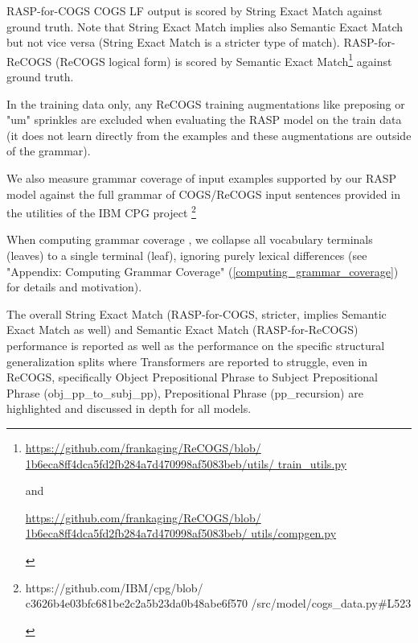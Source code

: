 \documentclass[11pt]{article}
\begin{document}
RASP-for-COGS COGS LF output is scored by String Exact Match against ground truth. Note that String Exact Match implies also Semantic Exact Match but not vice versa (String Exact Match is a stricter type of match).
RASP-for-ReCOGS (ReCOGS logical form) is scored by Semantic Exact Match\footnote{ 
\begin{footnotesize}\href{https://github.com/frankaging/ReCOGS/blob/1b6eca8ff4dca5fd2fb284a7d470998af5083beb/utils/train_utils.py}{https://github.com/frankaging/ReCOGS/blob/
1b6eca8ff4dca5fd2fb284a7d470998af5083beb/utils/
train\_utils.py}

and

\href{https://github.com/frankaging/ReCOGS/blob/1b6eca8ff4dca5fd2fb284a7d470998af5083beb/utils/compgen.py}{https://github.com/frankaging/ReCOGS/blob/
1b6eca8ff4dca5fd2fb284a7d470998af5083beb/
utils/compgen.py}
\end{footnotesize}
} against ground truth.

In the training data only, any ReCOGS training augmentations like preposing or "um" sprinkles are excluded when evaluating the RASP model on the train data (it does not learn directly from the examples and these augmentations are outside of the grammar). 

We also measure grammar coverage of input examples supported by our RASP model against the full grammar of COGS/ReCOGS input sentences provided in the utilities of the IBM CPG project \citep{klinger2024compositionalprogramgenerationfewshot}\footnote{\begin{footnotesize}https://github.com/IBM/cpg/blob/
c3626b4e03bfc681be2c2a5b23da0b48abe6f570
/src/model/cogs\_data.py\#L523\end{footnotesize}
}

When computing grammar coverage \citep{fuzzingbook2023:GrammarCoverageFuzzer}, we collapse all vocabulary terminals (leaves) to a single terminal (leaf), ignoring purely lexical differences (see "Appendix: Computing Grammar Coverage" (\ref{computing_grammar_coverage}) for details and motivation).

The overall String Exact Match (RASP-for-COGS, stricter, implies Semantic Exact Match as well) and Semantic Exact Match (RASP-for-ReCOGS) performance is reported as well as the performance on the specific structural generalization splits where Transformers are reported to struggle, even in ReCOGS, specifically Object Prepositional Phrase to Subject Prepositional Phrase (obj\_pp\_to\_subj\_pp),
Prepositional Phrase (pp\_recursion) are highlighted and discussed in depth for all models.
\end{document}
